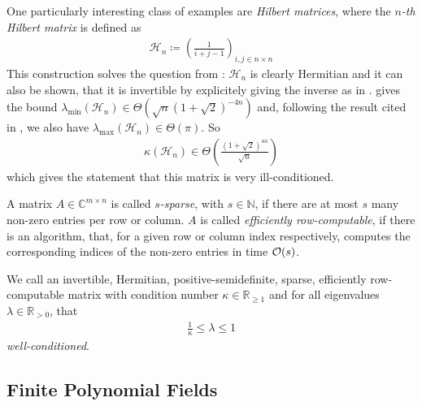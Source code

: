 \begin{example} \label{example_hilbert_matrices}
    One particularly interesting class of examples are \emph{Hilbert matrices}, where the \emph{\(n\)-th Hilbert matrix} is defined as
    \begin{align}
        \mathcal{H}_n \coloneqq \left(\frac{1}{i+j-1}\right)_{i, j \in n \times n}
    \end{align}
    This construction solves the question from : \(\mathcal{H}_n\) is clearly Hermitian and it can also be shown, that it is invertible by explicitely giving the inverse as in \cite[pp. 302, 306]{Choi_1983}. \cite[p. 51]{Wilf_1970} gives the bound \(\lambda_{\min}(\mathcal{H}_n) \in \Theta(\sqrt{n}(1+\sqrt{2})^{-4n})\) and, following the result cited in \cite[p. 111]{Todd1954}, we also have \(\lambda_{\max}(\mathcal{H}_n) \in \Theta(\pi)\). So
    \begin{align}
        \kappa(\mathcal{H}_n) \in \Theta\left(\frac{(1+\sqrt{2})^{4n}}{\sqrt{n}}\right)
    \end{align}
    which gives the statement that this matrix is very ill-conditioned.
\end{example}

\begin{definition} \label{sparse_and_efficiently_row_computable_matrices}
    A matrix \(A \in \mathbb{C}^{m \times n}\) is called \emph{\(s\)-sparse}, with \(s \in \mathbb{N}\), if there are at most \(s\) many non-zero entries per row or column. \(A\) is called \emph{efficiently row-computable}, if there is an algorithm, that, for a given row or column index respectively, computes the corresponding indices of the non-zero entries in time \(\operatorname{\mathcal{O}}(s)\).
\end{definition}

\begin{definition} \label{well_conditioned_matrices}
    We call an invertible, Hermitian, positive-semidefinite, sparse, efficiently row-com\-putable matrix with condition number \(\kappa \in \mathbb{R}_{\geq 1}\) and for all eigenvalues \(\lambda \in \mathbb{R}_{>0}\), that
    \begin{align}
        \frac{1}{\kappa} \leq \lambda \leq 1
    \end{align}
    \emph{well-conditioned}.
\end{definition}

\subsection{Finite Polynomial Fields }

